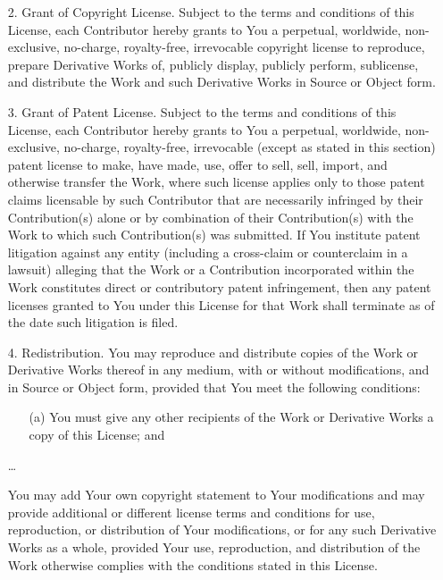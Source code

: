 \begin{licensequote}
  \begin{itemize}
  \item[2.]
      Grant of Copyright License. Subject to the terms and conditions of
      this License, each Contributor hereby grants to You a perpetual,
      worldwide, non-exclusive, no-charge, royalty-free, irrevocable
      copyright license to reproduce, prepare Derivative Works of,
      publicly display, publicly perform, sublicense, and distribute the
      Work and such Derivative Works in Source or Object form.

  \item[3.]
      Grant of Patent License. Subject to the terms and conditions of
      this License, each Contributor hereby grants to You a perpetual,
      worldwide, non-exclusive, no-charge, royalty-free, irrevocable
      (except as stated in this section) patent license to make, have made,
      use, offer to sell, sell, import, and otherwise transfer the Work,
      where such license applies only to those patent claims licensable
      by such Contributor that are necessarily infringed by their
      Contribution(s) alone or by combination of their Contribution(s)
      with the Work to which such Contribution(s) was submitted. If You
      institute patent litigation against any entity (including a
      cross-claim or counterclaim in a lawsuit) alleging that the Work
      or a Contribution incorporated within the Work constitutes direct
      or contributory patent infringement, then any patent licenses
      granted to You under this License for that Work shall terminate
      as of the date such litigation is filed.

  \item [4.]
      Redistribution. You may reproduce and distribute copies of the
      Work or Derivative Works thereof in any medium, with or without
      modifications, and in Source or Object form, provided that You
      meet the following conditions:

      \begin{itemize}
      \item[(a)]
          You must give any other recipients of the Work or
          Derivative Works a copy of this License; and
      \end{itemize}
      \dots

      You may add Your own copyright statement to Your modifications and
      may provide additional or different license terms and conditions
      for use, reproduction, or distribution of Your modifications, or
      for any such Derivative Works as a whole, provided Your use,
      reproduction, and distribution of the Work otherwise complies with
      the conditions stated in this License.


\end{itemize}
\end{licensequote}
